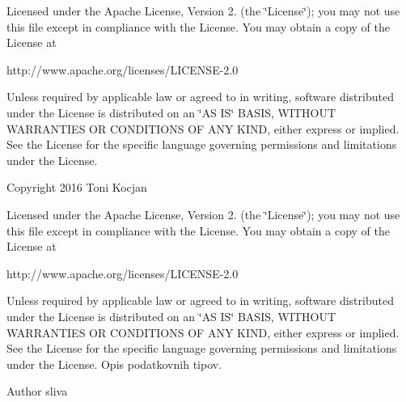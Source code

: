 Licensed under the Apache License, Version 2. (the \char`\"{}\+License\char`\"{}); you may not use this file except in compliance with the License. You may obtain a copy of the License at \begin{DoxyVerb}http://www.apache.org/licenses/LICENSE-2.0
\end{DoxyVerb}


Unless required by applicable law or agreed to in writing, software distributed under the License is distributed on an \char`\"{}\+A\+S I\+S\char`\"{} B\+A\+S\+IS, W\+I\+T\+H\+O\+UT W\+A\+R\+R\+A\+N\+T\+I\+ES OR C\+O\+N\+D\+I\+T\+I\+O\+NS OF A\+NY K\+I\+ND, either express or implied. See the License for the specific language governing permissions and limitations under the License.

Copyright 2016 Toni Kocjan

Licensed under the Apache License, Version 2. (the \char`\"{}\+License\char`\"{}); you may not use this file except in compliance with the License. You may obtain a copy of the License at \begin{DoxyVerb}http://www.apache.org/licenses/LICENSE-2.0
\end{DoxyVerb}


Unless required by applicable law or agreed to in writing, software distributed under the License is distributed on an \char`\"{}\+A\+S I\+S\char`\"{} B\+A\+S\+IS, W\+I\+T\+H\+O\+UT W\+A\+R\+R\+A\+N\+T\+I\+ES OR C\+O\+N\+D\+I\+T\+I\+O\+NS OF A\+NY K\+I\+ND, either express or implied. See the License for the specific language governing permissions and limitations under the License. Opis podatkovnih tipov.

\begin{DoxyAuthor}{Author}
sliva 
\end{DoxyAuthor}
